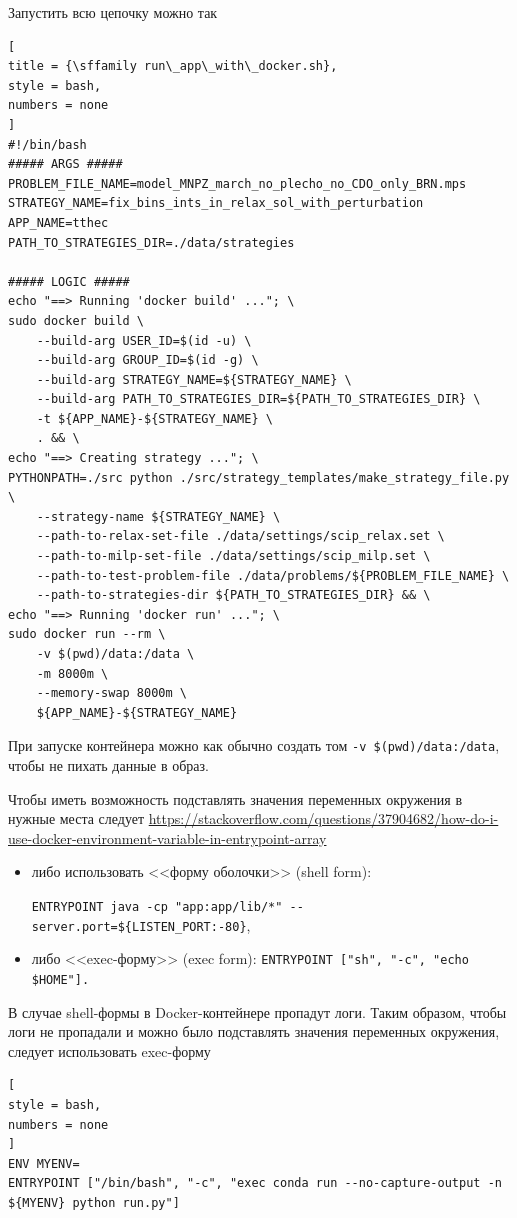 \documentclass[%
	11pt,
	a4paper,
	utf8,
		]{article}
\begin{document}
Запустить всю цепочку можно так
\begin{lstlisting}[
title = {\sffamily run\_app\_with\_docker.sh},
style = bash,
numbers = none
]
#!/bin/bash
##### ARGS #####
PROBLEM_FILE_NAME=model_MNPZ_march_no_plecho_no_CDO_only_BRN.mps
STRATEGY_NAME=fix_bins_ints_in_relax_sol_with_perturbation
APP_NAME=tthec
PATH_TO_STRATEGIES_DIR=./data/strategies

##### LOGIC #####
echo "==> Running 'docker build' ..."; \
sudo docker build \
	--build-arg USER_ID=$(id -u) \
	--build-arg GROUP_ID=$(id -g) \
	--build-arg STRATEGY_NAME=${STRATEGY_NAME} \
	--build-arg PATH_TO_STRATEGIES_DIR=${PATH_TO_STRATEGIES_DIR} \
	-t ${APP_NAME}-${STRATEGY_NAME} \
	. && \
echo "==> Creating strategy ..."; \
PYTHONPATH=./src python ./src/strategy_templates/make_strategy_file.py \
	--strategy-name ${STRATEGY_NAME} \
	--path-to-relax-set-file ./data/settings/scip_relax.set \
	--path-to-milp-set-file ./data/settings/scip_milp.set \
	--path-to-test-problem-file ./data/problems/${PROBLEM_FILE_NAME} \
	--path-to-strategies-dir ${PATH_TO_STRATEGIES_DIR} && \
echo "==> Running 'docker run' ..."; \
sudo docker run --rm \
	-v $(pwd)/data:/data \
	-m 8000m \
	--memory-swap 8000m \
	${APP_NAME}-${STRATEGY_NAME}
\end{lstlisting}

При запуске контейнера можно как обычно создать том \verb|-v $(pwd)/data:/data|, чтобы не пихать данные в образ.

Чтобы иметь возможность подставлять значения переменных окружения в нужные места следует \url{https://stackoverflow.com/questions/37904682/how-do-i-use-docker-environment-variable-in-entrypoint-array}
\begin{itemize}
	\item либо использовать <<форму оболочки>> (shell form):
	
	\verb|ENTRYPOINT java -cp "app:app/lib/*" --server.port=${LISTEN_PORT:-80}|,
	\item либо <<exec-форму>> (exec form): \verb|ENTRYPOINT ["sh", "-c", "echo $HOME"].|
\end{itemize}

В случае shell-формы в Docker-контейнере пропадут логи. Таким образом, чтобы логи не пропадали и можно было подставлять значения переменных окружения, следует использовать exec-форму
\begin{lstlisting}[
style = bash,
numbers = none
]
ENV MYENV=
ENTRYPOINT ["/bin/bash", "-c", "exec conda run --no-capture-output -n ${MYENV} python run.py"]
\end{lstlisting}
\end{document}
